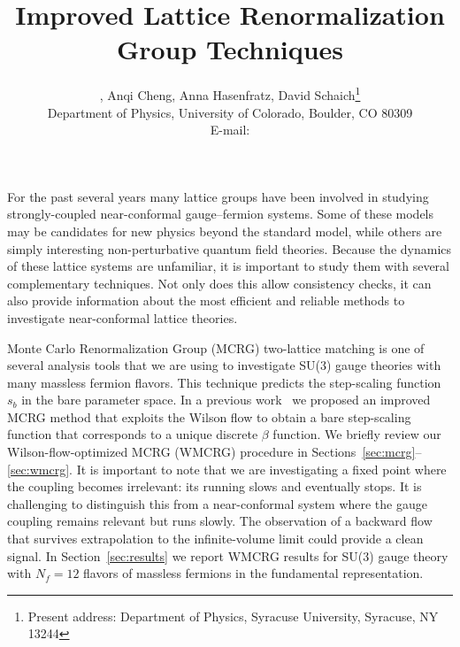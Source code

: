 \documentclass{PoS}
\title{Improved Lattice Renormalization Group Techniques}
\author{\speaker{Gregory Petropoulos}, Anqi Cheng, Anna Hasenfratz, David Schaich\footnote{Present address: Department of Physics, Syracuse University, Syracuse, NY 13244} \\
        Department of Physics, University of Colorado, Boulder, CO 80309 \\
        E-mail: \email{gregory.petropoulos@colorado.edu}}
\newcommand{\be}{\ensuremath{\beta} }
\newcommand{\secref}[1]{Section~\ref{#1}}
\begin{document}
For the past several years many lattice groups have been involved in studying strongly-coupled near-conformal gauge--fermion systems.
Some of these models may be candidates for new physics beyond the standard model, while others are simply interesting non-perturbative quantum field theories.
Because the dynamics of these lattice systems are unfamiliar, it is important to study them with several complementary techniques.
Not only does this allow consistency checks, it can also provide information about the most efficient and reliable methods to investigate near-conformal lattice theories.

Monte Carlo Renormalization Group (MCRG) two-lattice matching is one of several analysis tools that we are using to investigate SU(3) gauge theories with many massless fermion flavors.
This technique predicts the step-scaling function $s_b$ in the bare parameter space.
In a previous work~\cite{Petropoulos:2012mg} we proposed an improved MCRG method that exploits the Wilson flow to obtain a bare step-scaling function that corresponds to a unique discrete \be function.
We briefly review our Wilson-flow-optimized MCRG (WMCRG) procedure in Sections~\ref{sec:mcrg}--\ref{sec:wmcrg}.
It is important to note that we are investigating a fixed point where the coupling becomes irrelevant: its running slows and eventually stops.
It is challenging to distinguish this from a near-conformal system where the gauge coupling remains relevant but runs slowly.
The observation of a backward flow that survives extrapolation to the infinite-volume limit could provide a clean signal.
In \secref{sec:results} we report WMCRG results for SU(3) gauge theory with $N_f = 12$ flavors of massless fermions in the fundamental representation.
\end{document}
